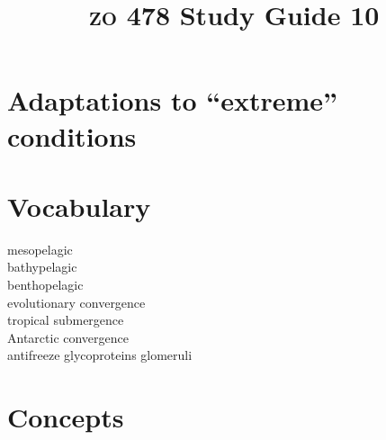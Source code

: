 \documentclass[letterpaper]{tufte-handout}
\title{{\scshape zo} 478 Study Guide 10}
\date{} %
\begin{document}
\maketitle	%

\section*{Adaptations to “extreme” conditions}


\section{Vocabulary} 
\vspace{-1\baselineskip}
\begin{multicols}{2}
mesopelagic \\
bathypelagic \\
benthopelagic \\
evolutionary convergence \\
tropical submergence \\
Antarctic convergence \\
antifreeze glycoproteins
glomeruli 
\end{multicols}

\section{Concepts}
\end{document}

